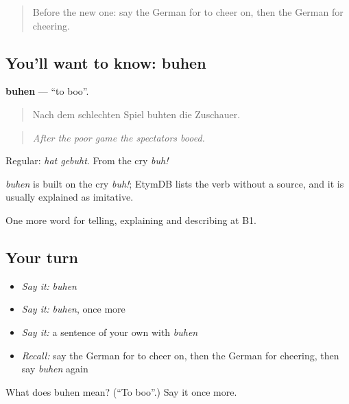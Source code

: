 \label{lesson:GE-C510-buhen}



\begin{quote}
Before the new one: say the German for to cheer on, then the German for cheering.
\end{quote}

\subsection*{You'll want to know: buhen}
\textbf{buhen} — \textquotedblleft{}to boo\textquotedblright{}.

\begin{quote}
Nach dem schlechten Spiel buhten die Zuschauer.
\end{quote}

\begin{quote}
\emph{After the poor game the spectators booed.}
\end{quote}

Regular: \emph{hat gebuht}. From the cry \emph{buh!}

\begin{cousinweb}
\emph{buhen} is built on the cry \emph{buh!}; EtymDB lists the verb without a source, and it is usually explained as imitative.
\end{cousinweb}

\begin{grammarlens}[title={What you've built}]
One more word for telling, explaining and describing at B1.
\end{grammarlens}

\subsection*{Your turn}
\begin{itemize}
\raggedright
  \item \emph{Say it:} \emph{buhen}
  \item \emph{Say it:} \emph{buhen}, once more
  \item \emph{Say it:} a sentence of your own with \emph{buhen}
  \item \emph{Recall:} say the German for to cheer on, then the German for cheering, then say \emph{buhen} again
\end{itemize}

\begin{tcolorbox}[breakable,colback=teal!4,colframe=teal!35!black,title={Before you move on}]
What does buhen mean? (\textquotedblleft{}To boo\textquotedblright{}.) Say it once more.
\end{tcolorbox}
